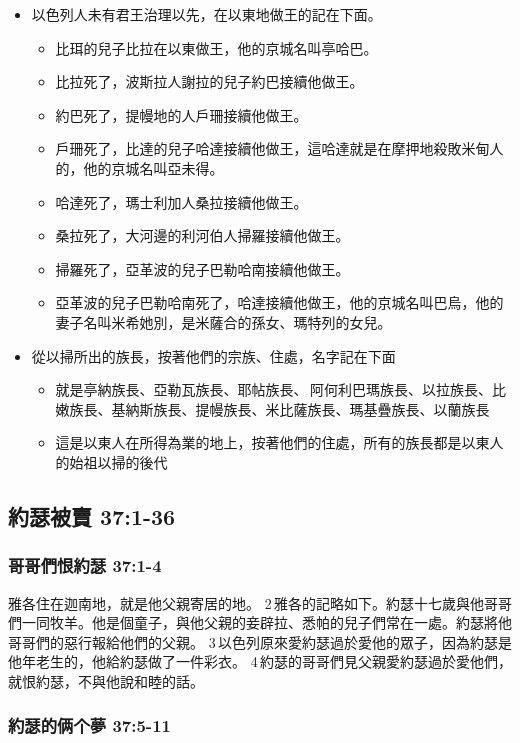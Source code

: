 \begin{itemize} 
\itemsep-.35em 
\item 以色列人未有君王治理以先，在以東地做王的記在下面。 
\begin{itemize} 
\itemsep-.35em 
\item 比珥的兒子比拉在以東做王，他的京城名叫亭哈巴。
\item 比拉死了，波斯拉人謝拉的兒子約巴接續他做王。 
\item 約巴死了，提幔地的人戶珊接續他做王。 
\item 戶珊死了，比達的兒子哈達接續他做王，這哈達就是在摩押地殺敗米甸人的，他的京城名叫亞未得。 
\item 哈達死了，瑪士利加人桑拉接續他做王。 
\item 桑拉死了，大河邊的利河伯人掃羅接續他做王。 
\item 掃羅死了，亞革波的兒子巴勒哈南接續他做王。 
\item 亞革波的兒子巴勒哈南死了，哈達接續他做王，他的京城名叫巴烏，他的妻子名叫米希她別，是米薩合的孫女、瑪特列的女兒。
\end{itemize}
\item 從以掃所出的族長，按著他們的宗族、住處，名字記在下面
\begin{itemize} 
\itemsep-.35em 
\item 就是亭納族長、亞勒瓦族長、耶帖族長、 阿何利巴瑪族長、以拉族長、比嫩族長、基納斯族長、提幔族長、米比薩族長、瑪基疊族長、以蘭族長
\item 這是以東人在所得為業的地上，按著他們的住處，所有的族長都是以東人的始祖以掃的後代
\end{itemize} 
\end{itemize}


\subsection{約瑟被賣 37:1-36 }
\subsubsection{哥哥們恨約瑟 37:1-4 }
雅各住在迦南地，就是他父親寄居的地。 2 雅各的記略如下。約瑟十七歲與他哥哥們一同牧羊。他是個童子，與他父親的妾辟拉、悉帕的兒子們常在一處。約瑟將他哥哥們的惡行報給他們的父親。 3 以色列原來愛約瑟過於愛他的眾子，因為約瑟是他年老生的，他給約瑟做了一件彩衣。 4 約瑟的哥哥們見父親愛約瑟過於愛他們，就恨約瑟，不與他說和睦的話。


\subsubsection{約瑟的俩个夢 37:5-11 }

